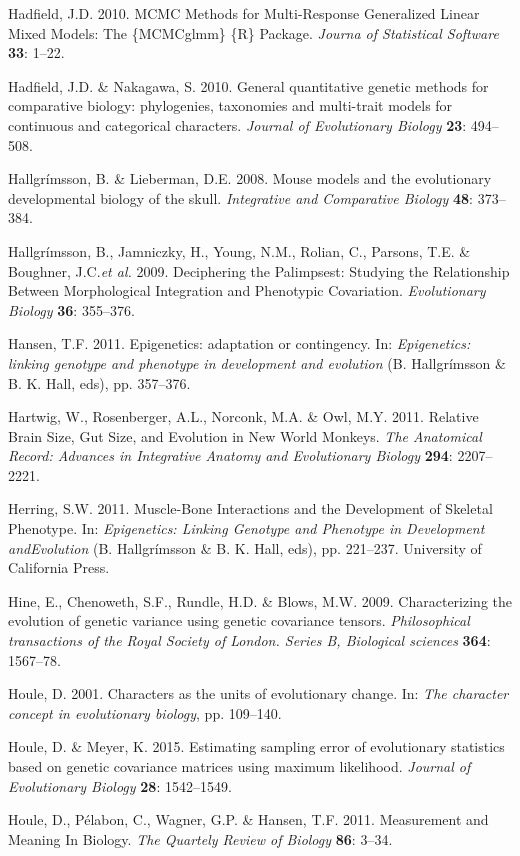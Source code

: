 \documentclass[12pt,twoside]{report}
\begin{document}
Hadfield, J.D. 2010. MCMC Methods for Multi-Response Generalized Linear
Mixed Models: The \{MCMCglmm\} \{R\} Package. \emph{Journa of
Statistical Software} \textbf{33}: 1--22.

Hadfield, J.D. \& Nakagawa, S. 2010. General quantitative genetic
methods for comparative biology: phylogenies, taxonomies and multi-trait
models for continuous and categorical characters. \emph{Journal of
Evolutionary Biology} \textbf{23}: 494--508.

Hallgrímsson, B. \& Lieberman, D.E. 2008. Mouse models and the
evolutionary developmental biology of the skull. \emph{Integrative and
Comparative Biology} \textbf{48}: 373--384.

Hallgrímsson, B., Jamniczky, H., Young, N.M., Rolian, C., Parsons, T.E.
\& Boughner, J.C.\emph{et al.} 2009. Deciphering the Palimpsest:
Studying the Relationship Between Morphological Integration and
Phenotypic Covariation. \emph{Evolutionary Biology} \textbf{36}:
355--376.

Hansen, T.F. 2011. Epigenetics: adaptation or contingency. In:
\emph{Epigenetics: linking genotype and phenotype in development and
evolution} (B. Hallgrímsson \& B. K. Hall, eds), pp. 357--376.

Hartwig, W., Rosenberger, A.L., Norconk, M.A. \& Owl, M.Y. 2011.
Relative Brain Size, Gut Size, and Evolution in New World Monkeys.
\emph{The Anatomical Record: Advances in Integrative Anatomy and
Evolutionary Biology} \textbf{294}: 2207--2221.

Herring, S.W. 2011. Muscle-Bone Interactions and the Development of
Skeletal Phenotype. In: \emph{Epigenetics: Linking Genotype and
Phenotype in Development andEvolution} (B. Hallgrímsson \& B. K. Hall,
eds), pp. 221--237. University of California Press.

Hine, E., Chenoweth, S.F., Rundle, H.D. \& Blows, M.W. 2009.
Characterizing the evolution of genetic variance using genetic
covariance tensors. \emph{Philosophical transactions of the Royal
Society of London. Series B, Biological sciences} \textbf{364}:
1567--78.

Houle, D. 2001. Characters as the units of evolutionary change. In:
\emph{The character concept in evolutionary biology}, pp. 109--140.

Houle, D. \& Meyer, K. 2015. Estimating sampling error of evolutionary
statistics based on genetic covariance matrices using maximum
likelihood. \emph{Journal of Evolutionary Biology} \textbf{28}:
1542--1549.

Houle, D., Pélabon, C., Wagner, G.P. \& Hansen, T.F. 2011. Measurement
and Meaning In Biology. \emph{The Quartely Review of Biology}
\textbf{86}: 3--34.
\end{document}
